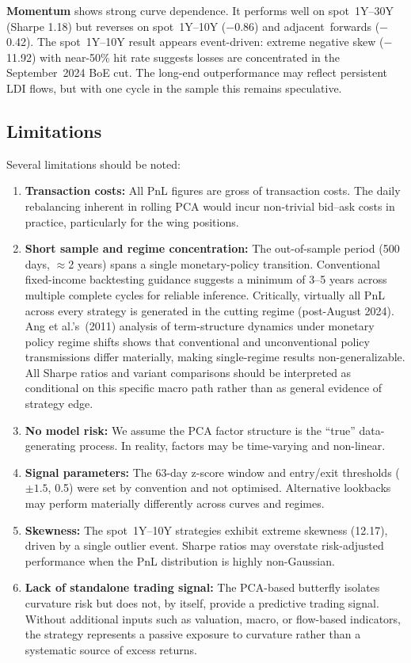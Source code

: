 \documentclass[11pt,a4paper]{article}
\begin{document}
\textbf{Momentum} shows strong curve dependence.  It performs well on
spot~1Y--30Y (Sharpe 1.18) but reverses on spot~1Y--10Y ($-$0.86)
and adjacent~forwards ($-$0.42).  The spot~1Y--10Y result appears
event-driven: extreme negative skew ($-$11.92) with near-50\% hit rate
suggests losses are concentrated in the September~2024 BoE cut.  The
long-end outperformance may reflect persistent LDI flows, but with one
cycle in the sample this remains speculative.

\subsection{Limitations}
Several limitations should be noted:
\begin{enumerate}
  \item \textbf{Transaction costs:} All PnL figures are gross of
        transaction costs.  The daily rebalancing inherent in rolling
        PCA would incur non-trivial bid--ask costs in practice,
        particularly for the wing positions.
  \item \textbf{Short sample and regime concentration:} The out-of-sample
        period (500 days, $\approx$2 years) spans a single monetary-policy
        transition.  Conventional fixed-income backtesting guidance suggests
        a minimum of 3--5 years across multiple complete cycles for reliable
        inference.  Critically, virtually all PnL across
        every strategy is generated in the cutting regime (post-August 2024).
        Ang et al.'s~(2011) analysis of term-structure dynamics under
        monetary policy regime shifts shows that conventional and
        unconventional policy transmissions differ materially, making
        single-regime results non-generalizable.  All Sharpe ratios and
        variant comparisons should be interpreted as conditional on this
        specific macro path rather than as general evidence of strategy edge.
  \item \textbf{No model risk:} We assume the PCA factor structure is
        the ``true'' data-generating process.  In reality, factors may
        be time-varying and non-linear.
  \item \textbf{Signal parameters:} The 63-day z-score window and
        entry/exit thresholds ($\pm1.5$, 0.5) were set by convention and
        not optimised.  Alternative lookbacks may perform materially
        differently across curves and regimes.
  \item \textbf{Skewness:} The spot~1Y--10Y strategies exhibit extreme
        skewness (12.17), driven by a single outlier event.  Sharpe
        ratios may overstate risk-adjusted performance when the PnL
        distribution is highly non-Gaussian.
\item \textbf{Lack of standalone trading signal:} The PCA-based butterfly
      isolates curvature risk but does not, by itself, provide a
      predictive trading signal.  Without additional inputs such as
      valuation, macro, or flow-based indicators, the strategy represents
      a passive exposure to curvature rather than a systematic source of
      excess returns.
\end{enumerate}
\end{document}
